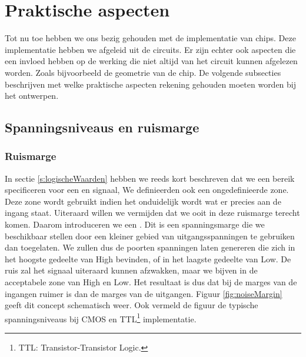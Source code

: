 \section{Praktische aspecten}
Tot nu toe hebben we ons bezig gehouden met de implementatie van chips. Deze implementatie hebben we afgeleid uit de circuits. Er zijn echter ook aspecten die een invloed hebben op de werking die niet altijd van het circuit kunnen afgelezen worden. Zoals bijvoorbeeld de geometrie van de chip. De volgende subsecties beschrijven met welke praktische aspecten rekening gehouden moeten worden bij het ontwerpen.
\subsection{Spanningsniveaus en ruismarge}
\subsubsection{Ruismarge}
In sectie \ref{s:logischeWaarden} hebben we reeds kort beschreven dat we een bereik specificeren voor een  en  signaal,  We definieerden ook een ongedefinieerde zone. Deze zone wordt gebruikt indien het onduidelijk wordt wat er precies aan de ingang staat. Uiteraard willen we vermijden dat we ooit in deze ruismarge terecht komen. Daarom introduceren we een . Dit is een spanningsmarge die we beschikbaar stellen door een kleiner gebied van uitgangsspanningen te gebruiken dan toegelaten. We zullen dus de poorten spanningen laten genereren die zich in het hoogste gedeelte van High bevinden, of in het laagste gedeelte van Low. De ruis zal het signaal uiteraard kunnen afzwakken, maar we bijven in de acceptabele zone van High en Low. Het resultaat is dus dat bij de marges van de ingangen ruimer is dan de marges van de uitgangen. Figuur \ref{fig:noiseMargin} geeft dit concept schematisch weer. Ook vermeld de figuur de typische spanningsniveaus bij CMOS en TTL\footnote{TTL: Transistor-Transistor Logic.} implementatie.
